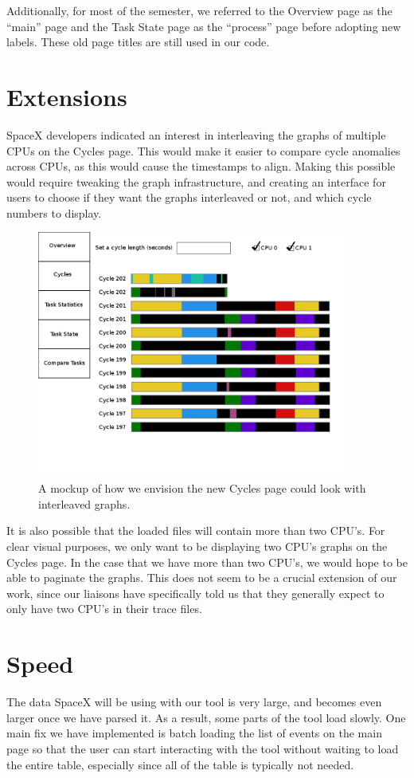 \documentclass{hmcclinic}
\begin{document}
  Additionally, for most of the semester, we referred to the Overview page as
  the ``main'' page and the Task State page as the ``process'' page before
  adopting new labels. These old page titles are still used in our code.

\section{Extensions}
  SpaceX developers indicated an interest in interleaving the graphs of multiple
  CPUs on the Cycles page.  This would make it easier to compare cycle
  anomalies across CPUs, as this would cause the timestamps to align. Making
  this possible would require tweaking the graph infrastructure, and creating an
  interface for users to choose if they want the graphs interleaved or not, and
  which cycle numbers to display.

  \begin{figure}[H]
\begin{center}
\includegraphics[width=4in]{futureCycles.png}
\caption{A mockup of how we envision the new Cycles page could look with
interleaved graphs.}
\end{center}
\end{figure}

It is also possible that the loaded files will contain more than two CPU's. For clear visual purposes, we only want to be displaying two CPU's graphs on the Cycles page. In the case that we have more than two CPU's, we would hope to be able to paginate the graphs. This does not seem to be a crucial extension of our work, since our liaisons have specifically told us that they generally expect to only have two CPU's in their trace files.


\section{Speed} %
The data SpaceX will be using with our tool is very large, and becomes even
larger once we have parsed it. As a result, some parts of the tool load slowly. One main fix we have
implemented is batch loading the list of events on the main page so that the
user can start interacting with the tool without waiting to load the entire
table, especially since all of the table is typically not needed.
\end{document}
